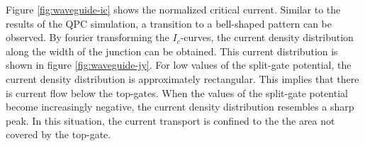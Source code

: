 Figure \ref{fig:waveguide-ic} shows the normalized critical current. Similar to the results of the QPC simulation, a transition to a bell-shaped pattern can be observed. By fourier transforming the $I_c$-curves, the current density distribution along the width of the junction can be obtained. This current distribution is shown in figure \ref{fig:waveguide-jy}. For low values of the split-gate potential, the current density distribution is approximately rectangular. This implies that there is current flow below the top-gates. When the values of the split-gate potential become increasingly negative, the current density distribution resembles a sharp peak. In this situation, the current transport is confined to the the area not covered by the top-gate.

